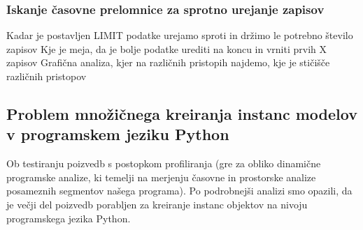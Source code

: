 \documentclass[a4paper,12pt,openright]{book}
\begin{document}
        \subsubsection{Iskanje časovne prelomnice za sprotno urejanje zapisov}
        
        \colorbox{BurntOrange}{Kadar je postavljen LIMIT podatke urejamo sproti in držimo le potrebno število zapisov}
        \colorbox{BurntOrange}{Kje je meja, da je bolje podatke urediti na koncu in vrniti prvih X zapisov}
        \colorbox{BurntOrange}{Grafična analiza, kjer na različnih pristopih najdemo, kje je stičišče različnih pristopov}

        \subsection{Problem množičnega kreiranja instanc modelov v programskem  jeziku Python}

        Ob testiranju poizvedb s postopkom profiliranja (gre za obliko dinamične programske analize, ki temelji na merjenju časovne in prostorske analize posameznih segmentov našega programa). Po podrobnejši analizi smo opazili, da je večji del poizvedb porabljen za kreiranje instanc objektov na nivoju programskega jezika Python.
\end{document}
